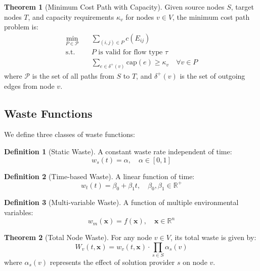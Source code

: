 \documentclass[12pt]{article}
\theoremstyle{definition}
\newtheorem{definition}{Definition}
\newtheorem{theorem}{Theorem}
\begin{document}
\begin{theorem}[Minimum Cost Path with Capacity]
Given source nodes $S$, target nodes $T$, and capacity requirements $\kappa_v$ for nodes $v \in V$, the minimum cost path problem is:
\begin{align*}
    \min_{P \in \mathcal{P}} \quad & \sum_{(i,j) \in P} c(E_{ij}) \\
    \text{s.t.} \quad & P \text{ is valid for flow type } \tau \\
    & \sum_{e \in \delta^+(v)} \text{cap}(e) \geq \kappa_v \quad \forall v \in P
\end{align*}
where $\mathcal{P}$ is the set of all paths from $S$ to $T$, and $\delta^+(v)$ is the set of outgoing edges from node $v$.
\end{theorem}

\subsection{Waste Functions}
We define three classes of waste functions:

\begin{definition}[Static Waste]
A constant waste rate independent of time:
\begin{equation}
    w_s(t) = \alpha, \quad \alpha \in [0,1]
\end{equation}
\end{definition}

\begin{definition}[Time-based Waste]
A linear function of time:
\begin{equation}
    w_t(t) = \beta_0 + \beta_1t, \quad \beta_0, \beta_1 \in \mathbb{R}^+
\end{equation}
\end{definition}

\begin{definition}[Multi-variable Waste]
A function of multiple environmental variables:
\begin{equation}
    w_m(\mathbf{x}) = f(\mathbf{x}), \quad \mathbf{x} \in \mathbb{R}^n
\end{equation}
\end{definition}

\begin{theorem}[Total Node Waste]
For any node $v \in V$, its total waste is given by:
\begin{equation}
    W_v(t, \mathbf{x}) = w_v(t, \mathbf{x}) \cdot \prod_{s \in S} \alpha_s(v)
\end{equation}
where $\alpha_s(v)$ represents the effect of solution provider $s$ on node $v$.
\end{theorem}
\end{document}
